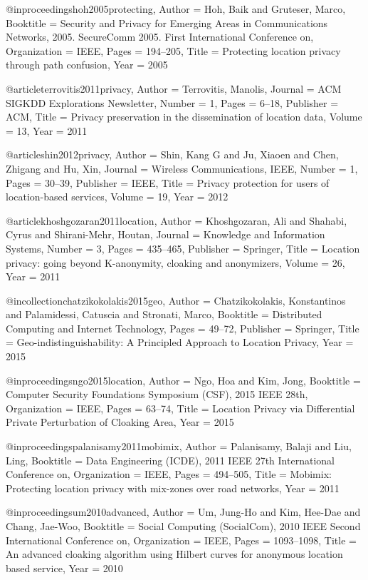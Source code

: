 {{{{{{{{{@inproceedings{hoh2005protecting,
	Author = {Hoh, Baik and Gruteser, Marco},
	Booktitle = {Security and Privacy for Emerging Areas in Communications Networks, 2005. SecureComm 2005. First International Conference on},
	Organization = {IEEE},
	Pages = {194--205},
	Title = {Protecting location privacy through path confusion},
	Year = {2005}}

@article{terrovitis2011privacy,
	Author = {Terrovitis, Manolis},
	Journal = {ACM SIGKDD Explorations Newsletter},
	Number = {1},
	Pages = {6--18},
	Publisher = {ACM},
	Title = {Privacy preservation in the dissemination of location data},
	Volume = {13},
	Year = {2011}}

@article{shin2012privacy,
	Author = {Shin, Kang G and Ju, Xiaoen and Chen, Zhigang and Hu, Xin},
	Journal = {Wireless Communications, IEEE},
	Number = {1},
	Pages = {30--39},
	Publisher = {IEEE},
	Title = {Privacy protection for users of location-based services},
	Volume = {19},
	Year = {2012}}

@article{khoshgozaran2011location,
	Author = {Khoshgozaran, Ali and Shahabi, Cyrus and Shirani-Mehr, Houtan},
	Journal = {Knowledge and Information Systems},
	Number = {3},
	Pages = {435--465},
	Publisher = {Springer},
	Title = {Location privacy: going beyond K-anonymity, cloaking and anonymizers},
	Volume = {26},
	Year = {2011}}

@incollection{chatzikokolakis2015geo,
	Author = {Chatzikokolakis, Konstantinos and Palamidessi, Catuscia and Stronati, Marco},
	Booktitle = {Distributed Computing and Internet Technology},
	Pages = {49--72},
	Publisher = {Springer},
	Title = {Geo-indistinguishability: A Principled Approach to Location Privacy},
	Year = {2015}}

@inproceedings{ngo2015location,
	Author = {Ngo, Hoa and Kim, Jong},
	Booktitle = {Computer Security Foundations Symposium (CSF), 2015 IEEE 28th},
	Organization = {IEEE},
	Pages = {63--74},
	Title = {Location Privacy via Differential Private Perturbation of Cloaking Area},
	Year = {2015}}

@inproceedings{palanisamy2011mobimix,
	Author = {Palanisamy, Balaji and Liu, Ling},
	Booktitle = {Data Engineering (ICDE), 2011 IEEE 27th International Conference on},
	Organization = {IEEE},
	Pages = {494--505},
	Title = {Mobimix: Protecting location privacy with mix-zones over road networks},
	Year = {2011}}

@inproceedings{um2010advanced,
	Author = {Um, Jung-Ho and Kim, Hee-Dae and Chang, Jae-Woo},
	Booktitle = {Social Computing (SocialCom), 2010 IEEE Second International Conference on},
	Organization = {IEEE},
	Pages = {1093--1098},
	Title = {An advanced cloaking algorithm using Hilbert curves for anonymous location based service},
	Year = {2010}}

}}}}}}}}}
